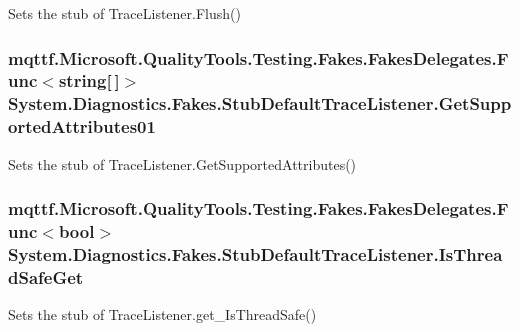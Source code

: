 Sets the stub of Trace\-Listener.\-Flush()

\hypertarget{class_system_1_1_diagnostics_1_1_fakes_1_1_stub_default_trace_listener_abfa7c950ced3522caa9db4146b15de63}{
\subsubsection[{Get\-Supported\-Attributes01}]{\setlength{\rightskip}{0pt plus 5cm}mqttf.\-Microsoft.\-Quality\-Tools.\-Testing.\-Fakes.\-Fakes\-Delegates.\-Func$<$string\mbox{[}$\,$\mbox{]}$>$ System.\-Diagnostics.\-Fakes.\-Stub\-Default\-Trace\-Listener.\-Get\-Supported\-Attributes01}}\label{class_system_1_1_diagnostics_1_1_fakes_1_1_stub_default_trace_listener_abfa7c950ced3522caa9db4146b15de63}


Sets the stub of Trace\-Listener.\-Get\-Supported\-Attributes()

\hypertarget{class_system_1_1_diagnostics_1_1_fakes_1_1_stub_default_trace_listener_ab92e07ba13230a20465000114613a312}{
\subsubsection[{Is\-Thread\-Safe\-Get}]{\setlength{\rightskip}{0pt plus 5cm}mqttf.\-Microsoft.\-Quality\-Tools.\-Testing.\-Fakes.\-Fakes\-Delegates.\-Func$<$bool$>$ System.\-Diagnostics.\-Fakes.\-Stub\-Default\-Trace\-Listener.\-Is\-Thread\-Safe\-Get}}\label{class_system_1_1_diagnostics_1_1_fakes_1_1_stub_default_trace_listener_ab92e07ba13230a20465000114613a312}


Sets the stub of Trace\-Listener.\-get\-\_\-\-Is\-Thread\-Safe()

